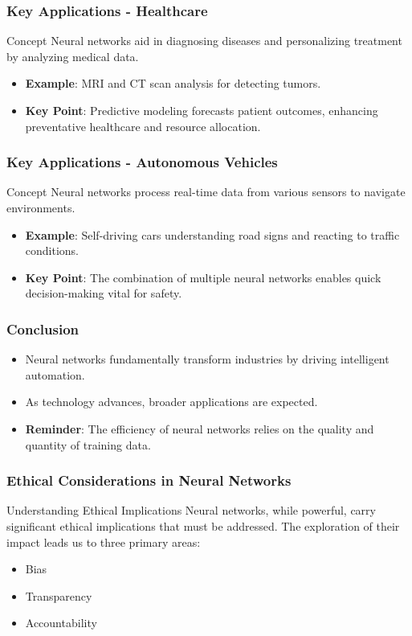 \documentclass[aspectratio=169]{beamer}
\begin{document}
\begin{frame}[fragile]
  \frametitle{Key Applications - Healthcare}
  \begin{block}{Concept}
    Neural networks aid in diagnosing diseases and personalizing treatment by analyzing medical data.
  \end{block}
  \begin{itemize}
    \item \textbf{Example}: MRI and CT scan analysis for detecting tumors.
    \item \textbf{Key Point}: Predictive modeling forecasts patient outcomes, enhancing preventative healthcare and resource allocation.
  \end{itemize}
\end{frame}

\begin{frame}[fragile]
  \frametitle{Key Applications - Autonomous Vehicles}
  \begin{block}{Concept}
    Neural networks process real-time data from various sensors to navigate environments.
  \end{block}
  \begin{itemize}
    \item \textbf{Example}: Self-driving cars understanding road signs and reacting to traffic conditions.
    \item \textbf{Key Point}: The combination of multiple neural networks enables quick decision-making vital for safety.
  \end{itemize}
\end{frame}

\begin{frame}[fragile]
  \frametitle{Conclusion}
  \begin{itemize}
    \item Neural networks fundamentally transform industries by driving intelligent automation.
    \item As technology advances, broader applications are expected.
    \item \textbf{Reminder}: The efficiency of neural networks relies on the quality and quantity of training data.
  \end{itemize}
\end{frame}

\begin{frame}[fragile]
  \frametitle{Ethical Considerations in Neural Networks}
  \begin{block}{Understanding Ethical Implications}
    Neural networks, while powerful, carry significant ethical implications that must be addressed. 
    The exploration of their impact leads us to three primary areas:
    \begin{itemize}
      \item Bias
      \item Transparency
      \item Accountability
    \end{itemize}
  \end{block}
\end{frame}
\end{document}
